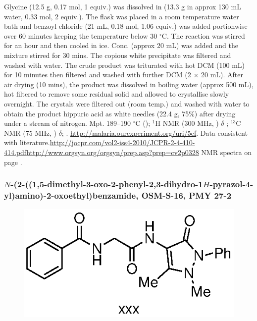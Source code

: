 \documentclass[12pt, a4paper,titlepage]{article}
\begin{document}
Glycine (12.5 g, 0.17 mol, 1 equiv.) was dissolved in  (13.3 g in approx 130 mL water, 0.33 mol, 2 equiv.). The flask was placed in a room temperature water bath and benzoyl chloride (21 mL, 0.18 mol, 1.06 equiv.) was added portionwise over 60 minutes keeping the temperature below 30 $^\circ$C. The reaction was stirred for an hour and then cooled in ice. Conc.  (approx 20 mL) was added and the mixture stirred for 30 mins. The copious white precipitate was filtered and washed with water. The crude product was triturated with hot DCM (100 mL) for 10 minutes then filtered and washed with  further DCM (2 $\times$ 20 mL). After air drying (10 mins), the product was  dissolved in boiling water (approx 500 mL), hot filtered to remove some residual solid and allowed to crystallise slowly overnight. The crystals were filtered out (room temp.) and washed with water to obtain the product hippuric acid as white needles (22.4 g, 75\%) after drying under a stream of nitrogen.
Mpt. 189--190 $^\circ$C (); 
$^1$H NMR (300 MHz, ) $\delta$ ; 
$^{13}$C NMR (75 MHz, ) $\delta$; 
 .
\url{ http://malaria.ourexperiment.org/uri/5ef}.
Data consistent with literature.\url{http://jocpr.com/vol2-iss4-2010/JCPR-2-4-410-414.pdf}\url{http://www.orgsyn.org/orgsyn/prep.asp?prep=cv2p0328}  NMR spectra on page \pageref{spec:PMY26}.

\subsubsection*{$N$-(2-((1,5-dimethyl-3-oxo-2-phenyl-2,3-dihydro-1$H$-pyrazol-4-yl)amino)-2-oxoethyl)benzamide, OSM-S-16, PMY 27-2}
\label{exp:PMY27}
	\begin{figure}[H]
	\begin{center}
	\includegraphics{exp/PMY27.eps}
	\end{center}
	\vspace{-25pt}	
	\end{figure}	
\end{document}
